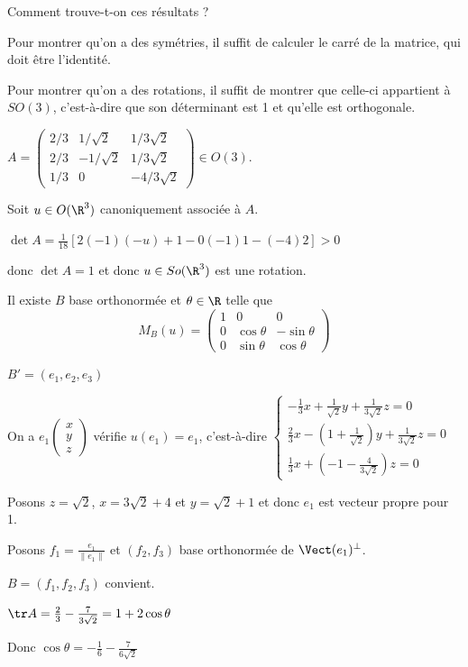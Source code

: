 \lvspace 

Comment trouve-t-on ces résultats ? 

Pour montrer qu'on a des symétries, il suffit de calculer le carré de la matrice, qui doit 
être l'identité.

Pour montrer qu'on a des rotations, il suffit de montrer que celle-ci appartient à $SO(3)$, 
c'est-à-dire que son déterminant est 1 et qu'elle est orthogonale.


\begin{exemple}
    $A = \begin{pmatrix}
        2/3 & 1/\sqrt 2 & 1/3 \sqrt 2 \\
        2 / 3 & - 1 / \sqrt 2 & 1/3 \sqrt 2\\
        1 / 3 & 0 & -4 / 3 \sqrt 2 
    \end{pmatrix} \in O(3)$. 

    Soit $u \in O(\R^3)$ canoniquement associée à $A$. 

    $\det A = \frac 1 {18} \left[ 2(-1)(-u) + 1 - 0(-1)1 - (-4)2\right] > 0$

    donc $\det A = 1$ et donc $u \in So(\R^3)$ est une rotation. 

    Il existe $B$ base orthonormée et $\theta \in \R$ telle que 
    $$M_B(u) = \begin{pmatrix}
        1 & 0 & 0 \\
        0 & \cos \theta & -\sin \theta \\
        0 & \sin \theta & \cos \theta
        \end{pmatrix}$$

    $B' = (e_1, e_2, e_3)$ 

    On a $e_1 \begin{pmatrix}
        x \\ y \\ z
    \end{pmatrix}$ vérifie $u(e_1) = e_1$, c'est-à-dire 
    $\begin{cases}
        -\frac 1 3x + \frac 1 {\sqrt 2} y + \frac 1 {3 \sqrt 2} z = 0 \\
        \frac 2 3 x -( 1 + \frac 1 {\sqrt 2}) y + \frac 1 {3 \sqrt 2} z = 0 \\
        \frac 1 3x + (- 1 - \frac 4 {3 \sqrt 2}) z = 0
    \end{cases}$

    Posons $z = \sqrt 2$, $x = 3 \sqrt 2 + 4$ et $y = \sqrt 2 +1$ et 
    donc $e_1$ est vecteur propre pour 1. 

    Posons $f_1 = \frac{e_1}{\| e_1 \|}$ et $(f_2, f_3)$ base orthonormée de $\Vect(e_1)^\perp$.

    $B = (f_1, f_2, f_3)$ convient. 

    $\tr A = \frac 2 3 - \frac 7 {3 \sqrt 2} = 1 + 2 \cos \theta$

    Donc $\cos \theta = - \frac 1 6 - \frac 7 {6 \sqrt 2}$
\end{exemple}

